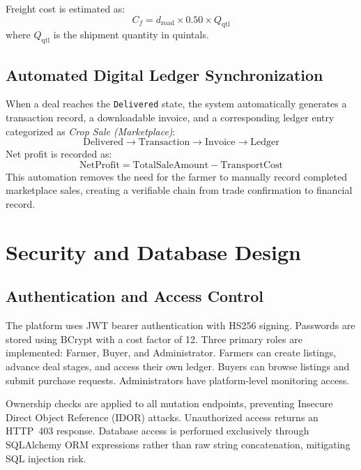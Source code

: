 \documentclass[conference]{IEEEtran}
\begin{document}
Freight cost is estimated as:
\begin{equation}
    C_f = d_{\mathrm{road}} \times 0.50 \times Q_{\mathrm{qtl}}
\end{equation}
where $Q_{\mathrm{qtl}}$ is the shipment quantity in quintals.

\subsection{Automated Digital Ledger Synchronization}

When a deal reaches the \texttt{Delivered} state, the system
automatically generates a transaction record, a downloadable invoice,
and a corresponding ledger entry categorized as
\emph{Crop Sale (Marketplace)}:
\begin{equation}
\mathrm{Delivered}
\rightarrow \mathrm{Transaction}
\rightarrow \mathrm{Invoice}
\rightarrow \mathrm{Ledger}
\end{equation}
Net profit is recorded as:
\begin{equation}
    \mathrm{NetProfit} = \mathrm{TotalSaleAmount} - \mathrm{TransportCost}
\end{equation}
This automation removes the need for the farmer to manually record
completed marketplace sales, creating a verifiable chain from trade
confirmation to financial record.

\section{Security and Database Design}

\subsection{Authentication and Access Control}

The platform uses JWT bearer authentication with HS256 signing.
Passwords are stored using BCrypt with a cost factor of 12.
Three primary roles are implemented: Farmer, Buyer, and
Administrator. Farmers can create listings, advance deal stages,
and access their own ledger. Buyers can browse listings and submit
purchase requests. Administrators have platform-level monitoring
access.

Ownership checks are applied to all mutation endpoints, preventing
Insecure Direct Object Reference (IDOR) attacks. Unauthorized
access returns an HTTP~403 response. Database access is performed
exclusively through SQLAlchemy ORM expressions rather than raw
string concatenation, mitigating SQL injection risk.
\end{document}
